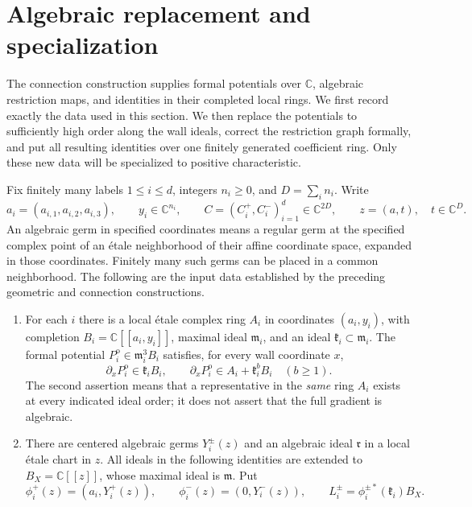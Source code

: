 \section{Algebraic replacement and specialization}
\label{sec:algebra}

The connection construction supplies formal potentials over $\mathbb C$,
algebraic restriction maps, and identities in their completed local rings.
We first record exactly the data used in this section. We then replace the
potentials to sufficiently high order along the wall ideals, correct the
restriction graph formally, and put all resulting identities over one
finitely generated coefficient ring. Only these new data will be
specialized to positive characteristic.

\begin{definition}
\label{alg:input-data}
Fix finitely many labels $1\leq i\leq d$, integers $n_i\geq0$, and
$D=\sum_i n_i$. Write
\[
 a_i=(a_{i,1},a_{i,2},a_{i,3}),\qquad
 y_i\in\mathbb C^{n_i},\qquad
 C=(C_i^+,C_i^-)_{i=1}^d\in\mathbb C^{2D},\qquad
 z=(a,t),\quad t\in\mathbb C^D.
\]
An algebraic germ in specified coordinates means a regular germ at the
specified complex point of an \'etale neighborhood of their affine
coordinate space, expanded in those coordinates. Finitely many such
germs can be placed in a common neighborhood. The following are the input
data established by the preceding geometric and connection constructions.
\begin{enumerate}
\item For each $i$ there is a local \'etale complex ring $A_i$ in
coordinates $(a_i,y_i)$, with completion
$B_i=\mathbb C[[a_i,y_i]]$, maximal ideal $\mathfrak m_i$, and an ideal
$\mathfrak k_i\subset\mathfrak m_i$. The formal potential
$P_i^{\mathrm{o}}\in\mathfrak m_i^3B_i$ satisfies, for every wall
coordinate $x$,
\[
 \partial_xP_i^{\mathrm{o}}\in\mathfrak k_iB_i,\qquad
 \partial_xP_i^{\mathrm{o}}\in A_i+\mathfrak k_i^bB_i
 \quad(b\geq1).
\]
The second assertion means that a representative in the \emph{same}
ring $A_i$ exists at every indicated ideal order; it does not assert that
the full gradient is algebraic.
\item There are centered algebraic germs $Y_i^\pm(z)$ and an algebraic
ideal $\mathfrak r$ in a local \'etale chart in $z$. All ideals
in the following identities are extended to
$B_X=\mathbb C[[z]]$, whose maximal ideal is $\mathfrak m$. Put
\[
 \phi_i^+(z)=(a_i,Y_i^+(z)),\qquad
 \phi_i^-(z)=(0,Y_i^-(z)),\qquad
 L_i^\pm=\phi_i^{\pm *}(\mathfrak k_i)B_X.
\]
\end{enumerate}
\end{definition}
